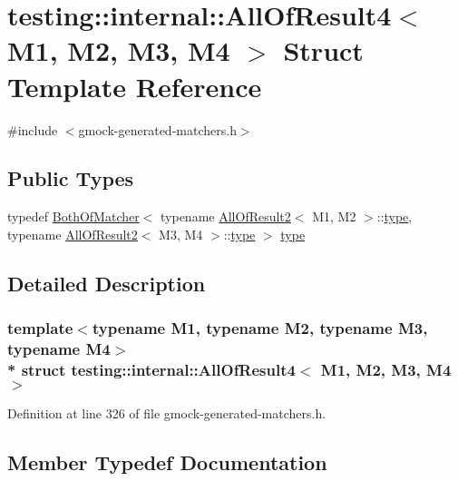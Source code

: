 \hypertarget{structtesting_1_1internal_1_1_all_of_result4}{}\section{testing\+:\+:internal\+:\+:All\+Of\+Result4$<$ M1, M2, M3, M4 $>$ Struct Template Reference}
\label{structtesting_1_1internal_1_1_all_of_result4}


{\ttfamily \#include $<$gmock-\/generated-\/matchers.\+h$>$}

\subsection*{Public Types}
\begin{DoxyCompactItemize}
\item 
typedef \hyperlink{classtesting_1_1internal_1_1_both_of_matcher}{Both\+Of\+Matcher}$<$ typename \hyperlink{structtesting_1_1internal_1_1_all_of_result2}{All\+Of\+Result2}$<$ M1, M2 $>$\+::\hyperlink{structtesting_1_1internal_1_1_all_of_result4_ab277e20178bac632d4e5a39a1a407bbf}{type}, typename \hyperlink{structtesting_1_1internal_1_1_all_of_result2}{All\+Of\+Result2}$<$ M3, M4 $>$\+::\hyperlink{structtesting_1_1internal_1_1_all_of_result4_ab277e20178bac632d4e5a39a1a407bbf}{type} $>$ \hyperlink{structtesting_1_1internal_1_1_all_of_result4_ab277e20178bac632d4e5a39a1a407bbf}{type}
\end{DoxyCompactItemize}


\subsection{Detailed Description}
\subsubsection*{template$<$typename M1, typename M2, typename M3, typename M4$>$\\*
struct testing\+::internal\+::\+All\+Of\+Result4$<$ M1, M2, M3, M4 $>$}



Definition at line 326 of file gmock-\/generated-\/matchers.\+h.



\subsection{Member Typedef Documentation}
